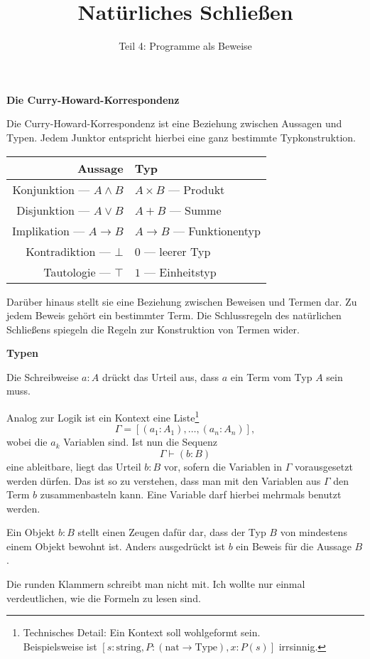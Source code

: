\documentclass[8pt]{beamer}
\title{Natürliches Schließen}
\subtitle{Teil 4: Programme als Beweise}
\date{}
\newcommand{\strong}[1]{\textsf{\textbf{#1}}}
\newcommand{\centerheadline}[1]{%
  \begin{center}\strong{#1}\end{center}}
\newcommand{\parspace}{\vspace{0.8em}}
\newcommand{\cond}{\rightarrow}
\begin{document}
\begin{frame}
\maketitle
\end{frame}

\begin{frame}
\centerheadline{Die Curry-Howard-Korrespondenz}
\end{frame}

\begin{frame}
Die Curry-Howard-Korrespondenz ist eine Beziehung zwischen Aussagen und
Typen. Jedem Junktor entspricht hierbei eine ganz bestimmte Typkonstruktion.\pause
\begin{center}
\begin{tabular}{rl}
\toprule
\strong{Aussage} & \strong{Typ}\\
\midrule
Konjunktion --- $A\land B$ & $A\times B$ --- Produkt\\
Disjunktion --- $A\lor B$ & $A+B$ --- Summe\\
Implikation --- $A\cond B$ & $A\to B$ --- Funktionentyp\\
Kontradiktion --- $\bot$ & $0$ --- leerer Typ\\
Tautologie --- $\top$ & $1$ --- Einheitstyp\\
\bottomrule
\end{tabular}
\end{center}\pause
Darüber hinaus stellt sie eine Beziehung zwischen Beweisen und Termen
dar. Zu jedem Beweis gehört ein bestimmter Term. Die Schlussregeln des
natürlichen Schließens spiegeln die Regeln zur Konstruktion von
Termen wider.
\end{frame}

\begin{frame}[t]
\strong{Typen}

\vspace{3em}
Die Schreibweise $a\colon A$ drückt das Urteil aus, dass $a$ ein Term
vom Typ $A$ sein muss.\pause

\parspace
Analog zur Logik ist ein Kontext eine Liste\footnote{Technisches Detail:
Ein Kontext soll wohlgeformt sein.\\
Beispielsweise ist
$[s\colon\mathrm{string}, P\colon (\mathrm{nat}\to\mathrm{Type}), x\colon P(s)]$
irrsinnig.}
\[\Gamma = [(a_1\colon A_1),\ldots,(a_n\colon A_n)],\]
wobei die $a_k$ Variablen sind. Ist nun die Sequenz
\[\Gamma\vdash (b\colon B)\]
eine ableitbare, liegt das Urteil $b\colon B$ vor, sofern die Variablen
in $\Gamma$ vorausgesetzt werden dürfen. Das ist so zu verstehen,
dass man mit den Variablen aus $\Gamma$ den Term $b$ zusammenbasteln kann.
Eine Variable darf hierbei mehrmals benutzt werden.

\parspace
Ein Objekt $b\colon B$ stellt einen Zeugen dafür dar, dass der Typ
$B$ von mindestens einem Objekt bewohnt ist. Anders ausgedrückt ist
$b$ ein Beweis für die Aussage $B$.

\parspace
\begin{small}
Die runden Klammern schreibt man nicht mit. Ich wollte nur einmal
verdeutlichen, wie die Formeln zu lesen sind.
\end{small}
\end{frame}
\end{document}
